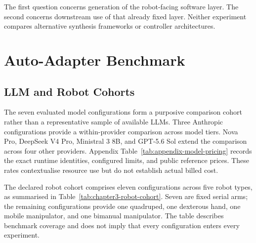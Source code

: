 The first question concerns generation of the robot-facing software layer. The
second concerns downstream use of that already fixed layer. Neither experiment
compares alternative synthesis frameworks or controller architectures.

\section[Auto-Adapter Benchmark]{Auto-Adapter Benchmark}

\subsection{LLM and Robot Cohorts}

The seven evaluated model configurations form a purposive comparison cohort
rather than a representative sample of available LLMs. Three Anthropic
configurations provide a within-provider comparison across model tiers. Nova
Pro, DeepSeek V4 Pro, Ministral 3 8B, and GPT-5.6 Sol extend the comparison
across four other providers. Appendix
Table~\ref{tab:appendix-model-pricing} records the exact runtime identities,
configured limits, and public reference prices. These rates contextualise
resource use but do not establish actual billed cost.

The declared robot cohort comprises eleven configurations across five robot
types, as summarised in Table~\ref{tab:chapter3-robot-cohort}. Seven are fixed
serial arms; the remaining configurations provide one quadruped, one
dexterous hand, one mobile manipulator, and one bimanual manipulator. The table
describes benchmark coverage and does not imply that every configuration
enters every experiment.

